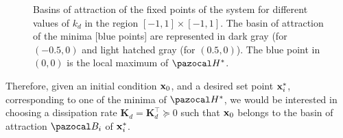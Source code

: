 %
\begin{figure}[!ht]
	\centering
	\caption[Basins of attraction of the fixed points of the system for different values of $k_d$]{Basins of attraction of the fixed points of the system for different values of $k_d$ in the region $[-1,1]\times [-1,1]$. The basin of attraction of the minima [blue points] are represented in dark gray (for $(-0.5,0)$ and light hatched gray (for $(0.5,0)$). The blue point in $(0,0)$ is the local maximum of $\Ha^*$.}
	\label{fig:basin}
\end{figure}
%
\newline

%
Therefore, given an initial condition $\mathbf{x}_0$, and a desired set point $\mathbf{x}_i^*$, corresponding to one of the minima of $\Ha^*$, we would be interested in choosing a dissipation rate $\mathbf{K}_d=\mathbf{K}_d^\top\succeq 0$ such that $\mathbf{x}_0$ belongs to the basin of attraction $\B_i$ of $\mathbf{x}_i^*$. 

